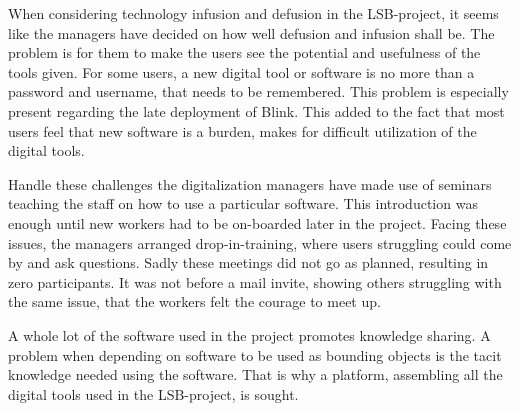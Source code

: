 When considering technology infusion and defusion in the LSB-project, it seems like the managers have decided on how well defusion and infusion shall be. The problem is for them to make the users see the potential and usefulness of the tools given. For some users, a new digital tool or software is no more than a password and username, that needs to be remembered. This problem is especially present regarding the late deployment of Blink. This added to the fact that most users feel that new software is a burden, makes for difficult utilization of the digital tools. 

Handle these challenges the digitalization managers have made use of seminars teaching the staff on how to use a particular software. This introduction was enough until new workers had to be on-boarded later in the project. Facing these issues, the managers arranged drop-in-training, where users struggling could come by and ask questions. Sadly these meetings did not go as planned, resulting in zero participants. It was not before a mail invite, showing others struggling with the same issue, that the workers felt the courage to meet up. 

A whole lot of the software used in the project promotes knowledge sharing. A problem when depending on software to be used as bounding objects is the tacit knowledge needed using the software. That is why a platform, assembling all the digital tools used in the LSB-project, is sought.

\cleardoublepage